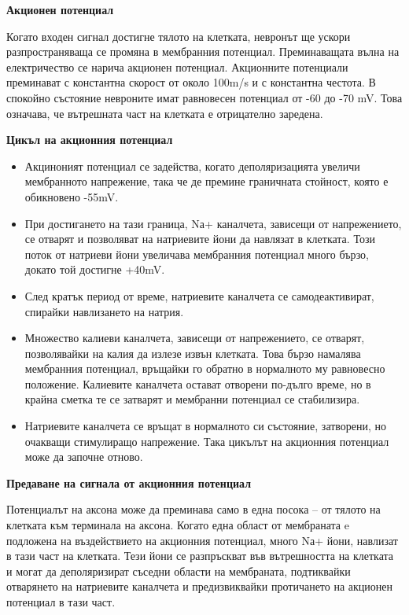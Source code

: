 \documentclass{article}
\numberwithin{equation}{section}
\begin{document}
\vspace{5mm} %
\textbf{Акционен потенциал}

Когато входен сигнал достигне тялото на клетката, невронът ще ускори разпространяваща се промяна в мембранния потенциал. Преминаващата вълна
на електричество се нарича акционен потенциал. Акционните потенциали преминават с константна скорост от около 100m/s и с константна честота.
В спокойно състояние невроните имат равновесен потенциал от -60 до -70 mV. Това означава, че вътрешната част на клетката е отрицателно
заредена.

\vspace{5mm} %
\textbf{Цикъл на акционния потенциал}

\begin{itemize}
\item Акциноният потенциал се задейства, когато деполяризацията увеличи мембранното напрежение, така че де премине граничната стойност, която е
обикновено -55mV.
\item При достигането на тази граница, Nа+ каналчета, зависещи от напрежението, се отварят и позволяват на натриевите йони да
навлязат в клетката. Този поток от натриеви йони увеличава мембранния потенциал много бързо, докато той достигне +40mV.
\item След кратък период от време, натриевите каналчета се самодеактивират, спирайки навлизането на натрия.
\item Множество калиеви каналчета, зависещи от напрежението, се отварят, позволявайки на калия да излезе извън клетката. Това бързо намалява
    мембранния потенциал, връщайки го обратно в нормалното му равновесно положение. Калиевите каналчета остават отворени по-дълго време, но
    в крайна сметка те се затварят и мембранни потенциал се стабилизира.
\item Натриевите каналчета се връщат в нормалното си състояние, затворени, но очакващи стимулиращо напрежение.  Така цикълът на акционния
потенциал може да започне отново.
\end{itemize}
\vspace{5mm} %
\textbf{Предаване на сигнала от акционния потенциал}

Потенциалът на аксона може да преминава само в една посока -- от тялото на клетката към терминала на аксона. Когато една област от
мембраната e подложена на въздействието на акционния потенциал, много Nа+ йони, навлизат в тази част на клетката. Тези йони се разпръскват
във вътрешността на клетката и могат да деполяризират съседни области на мембраната, подтиквайки отварянето на натриевите каналчета и
предизвиквайки протичането на акционен потенциал в тази част.
\end{document}
